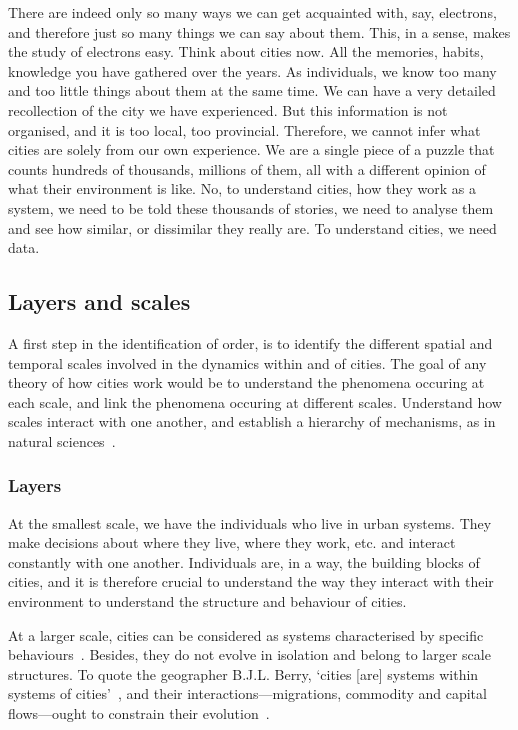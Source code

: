 There are indeed only so many ways we can get acquainted with, say, electrons, and
therefore just so many things we can say about them. This, in a sense, makes the
study of electrons easy. Think about cities now. All the memories, habits,
knowledge you have gathered over the years. As individuals, we know too many and
too little things about them at the same time. We can have a very detailed
recollection of the city we have experienced. But this information is not
organised, and it is too local, too provincial. Therefore, we cannot infer what
cities are solely from our own experience.  We are a single piece of a puzzle
that counts hundreds of thousands, millions of them, all with a different
opinion of what their environment is like. No, to understand cities, how they
work as a system, we need to be told these thousands of stories, we need to
analyse them and see how similar, or dissimilar they really are. To understand
cities, we need data.\\


\subsection{Layers and scales}
\label{sub:layers_and_scales}

A first step in the identification of order, is to identify the different
spatial and temporal scales involved in the dynamics within and of cities. The
goal of any theory of how cities work would be to understand the phenomena
occuring at each scale, and link the phenomena occuring at different scales.
Understand how scales interact with one another, and establish a hierarchy of
mechanisms, as in natural sciences~\cite{Simon:1962}.



\subsubsection{Layers}
\label{ssub:layers}

At the smallest scale, we have the individuals who live in urban
systems. They make decisions about where they live, where they work, etc. and
interact constantly with one another. Individuals are, in a way, the building
blocks of cities, and it is therefore crucial to understand the way they
interact with their environment to understand the structure and behaviour of
cities.

At a larger scale, cities can be considered as systems characterised by specific
behaviours~\cite{Bettencourt:2007}. Besides, they do not evolve in isolation and
belong to larger scale structures. To quote the geographer B.J.L. Berry, `cities
[are] systems within systems of cities'~\cite{Berry:1964}, and their
interactions---migrations, commodity and capital flows---ought to constrain
their evolution~\cite{Pumain:2010}. 

